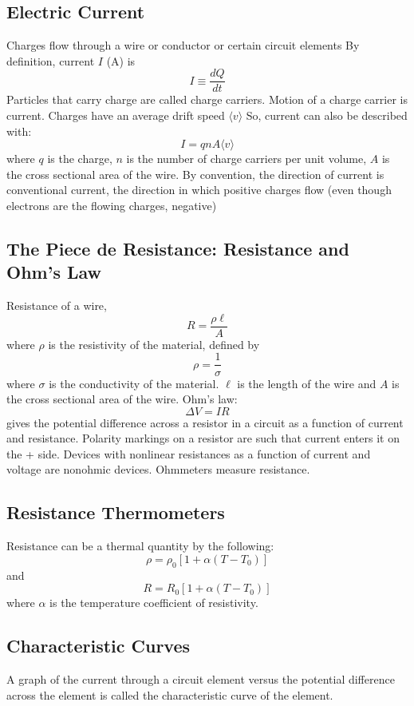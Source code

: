\documentclass[twocolumn]{article}
\begin{document}
\subsection{Electric Current}
\begin{outline}
	\1 Charges flow through a wire or conductor or certain circuit elements
	\1 By definition, current $I$ (A) is \[I\equiv\dfrac{dQ}{dt}\]
	\1 Particles that carry charge are called charge carriers. Motion of a charge carrier is current. 
	\1 Charges have an average drift speed \(\langle v\rangle\)
	\1 So, current can also be described with: \[I=qnA\langle v\rangle\] where $q$ is the charge, $n$ is the number of charge carriers per unit volume, $A$ is the cross sectional area of the wire. 
	\1 By convention, the direction of current is conventional current, the direction in which positive charges flow (even though electrons are the flowing charges, negative)

\end{outline}
\subsection{The Piece de Resistance: Resistance and Ohm's Law}
\begin{outline}
	\1 Resistance of a wire, \[R=\dfrac{\rho\ell}{A}\] where $\rho$ is the resistivity of the material, defined by \[\rho=\dfrac{1}{\sigma}\] where $\sigma$ is the conductivity of the material. $\ell$ is the length of the wire and $A$ is the cross sectional area of the wire. 
	\1 Ohm's law: \[\Delta V=IR\] gives the potential difference across a resistor in a circuit as a function of current and resistance. 
	\1 Polarity markings on a resistor are such that current enters it on the + side.
	\1 Devices with nonlinear resistances as a function of current and voltage are nonohmic devices. 
	\1 Ohmmeters measure resistance.
\end{outline}
\subsection{Resistance Thermometers}
\begin{outline}
	\1 Resistance can be a thermal quantity by the following: \[\rho=\rho_0[1+\alpha(T-T_0)]\] and \[R=R_0[1+\alpha(T-T_0)]\] where $\alpha$ is the temperature coefficient of resistivity. 

\end{outline}
\subsection{Characteristic Curves}
\begin{outline}
	\1 A graph of the current through a circuit element versus the potential difference across the element is called the characteristic curve of the element. 
\end{outline}
\end{document}
